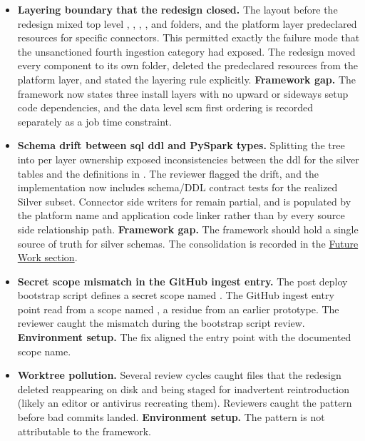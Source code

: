 \begin{itemize}
    \item \textbf{Layering boundary that the redesign closed.} The layout before the redesign mixed top level , , , , and  folders, and the platform layer predeclared resources for specific connectors. This permitted exactly the failure mode that the unsanctioned fourth ingestion category had exposed. The redesign moved every component to its own folder, deleted the predeclared resources from the platform layer, and stated the layering rule explicitly. \textbf{Framework gap.} The framework now states three install layers with no upward or sideways setup code dependencies, and the data level \gls{scm} first ordering is recorded separately as a job time constraint.

    \item \textbf{Schema drift between \gls{sql} \gls{ddl} and PySpark types.} Splitting the  tree into per layer ownership exposed inconsistencies between the \gls{ddl} for the silver tables and the  definitions in . The reviewer flagged the drift, and the implementation now includes schema/DDL contract tests for the realized Silver subset. Connector side writers for  remain partial, and  is populated by the platform name and application code linker rather than by every source side relationship path. \textbf{Framework gap.} The framework should hold a single source of truth for silver schemas. The consolidation is recorded in the \hyperref[sec:future-work]{Future Work section}.

    \item \textbf{Secret scope mismatch in the GitHub ingest entry.} The post deploy bootstrap script defines a secret scope named . The GitHub ingest entry point read from a scope named , a residue from an earlier prototype. The reviewer caught the mismatch during the bootstrap script review. \textbf{Environment setup.} The fix aligned the entry point with the documented scope name.

    \item \textbf{Worktree pollution.} Several review cycles caught files that the redesign deleted reappearing on disk and being staged for inadvertent reintroduction (likely an editor or antivirus recreating them). Reviewers caught the pattern before bad commits landed. \textbf{Environment setup.} The pattern is not attributable to the framework.


\end{itemize}
